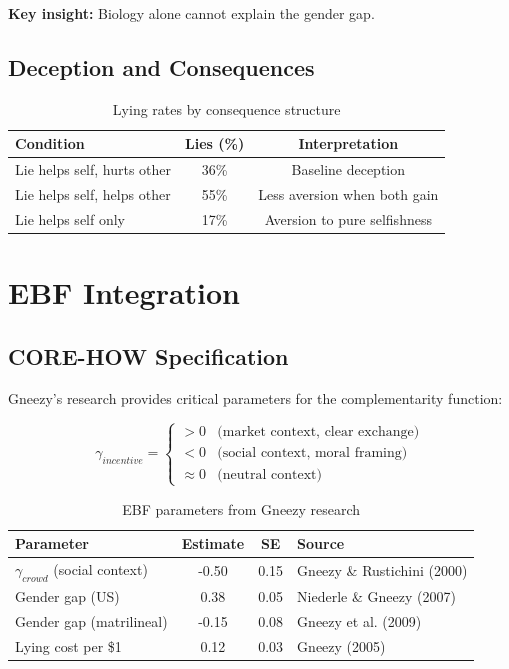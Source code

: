 \textbf{Key insight:} Biology alone cannot explain the gender gap.

\subsection{Deception and Consequences}

\begin{table}[h]
\centering
\begin{tabular}{lcc}
\hline
\textbf{Condition} & \textbf{Lies (\%)} & \textbf{Interpretation} \\
\hline
Lie helps self, hurts other & 36\% & Baseline deception \\
Lie helps self, helps other & 55\% & Less aversion when both gain \\
Lie helps self only & 17\% & Aversion to pure selfishness \\
\hline
\end{tabular}
\caption{Lying rates by consequence structure}
\end{table}

\section{EBF Integration}

\subsection{CORE-HOW Specification}

Gneezy's research provides critical parameters for the complementarity function:

\begin{equation}
\gamma_{incentive} = \begin{cases}
> 0 & \text{(market context, clear exchange)} \\
< 0 & \text{(social context, moral framing)} \\
\approx 0 & \text{(neutral context)}
\end{cases}
\end{equation}

\begin{table}[h]
\centering
\begin{tabular}{lccl}
\hline
\textbf{Parameter} & \textbf{Estimate} & \textbf{SE} & \textbf{Source} \\
\hline
$\gamma_{crowd}$ (social context) & -0.50 & 0.15 & Gneezy \& Rustichini (2000) \\
Gender gap (US) & 0.38 & 0.05 & Niederle \& Gneezy (2007) \\
Gender gap (matrilineal) & -0.15 & 0.08 & Gneezy et al. (2009) \\
Lying cost per \$1 & 0.12 & 0.03 & Gneezy (2005) \\
\hline
\end{tabular}
\caption{EBF parameters from Gneezy research}
\end{table}

